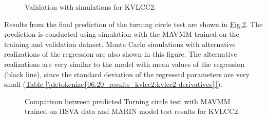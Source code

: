 \documentclass[review]{elsarticle}
\begin{document}
\begin{figure}[H]
\centering
\capstart

\noindent{}
\caption{Validation with simulations for KVLCC2.}\label{\detokenize{06.20_results_kvlcc2:fig-kvlcc2-validation-sim}}\end{figure}

\sphinxAtStartPar
Results from the final prediction of the turning circle test are shown in \hyperref[\detokenize{06.20_results_kvlcc2:fig-kvlcc2-testing-sim}]{Fig.\@ \ref{\detokenize{06.20_results_kvlcc2:fig-kvlcc2-testing-sim}}}. The prediction is conducted using simulation with the MAVMM trained on the training and validation dataset. Monte Carlo simulations with alternative realizations of the regression are also shown in this figure. The alternative realizations are very similar to the model with mean values of the regression (black line), since the standard deviation of the regressed parameters are very small (\hyperref[\detokenize{06.20_results_kvlcc2:kvlcc2-derivatives}]{Table \ref{\detokenize{06.20_results_kvlcc2:kvlcc2-derivatives}}}).

\begin{figure}[H]
\centering
\capstart

\noindent{}
\caption{Comparison between predicted Turning circle test with MAVMM trained on HSVA data and MARIN model test results for KVLCC2.}\label{\detokenize{06.20_results_kvlcc2:fig-kvlcc2-testing-sim}}\end{figure}
\end{document}
